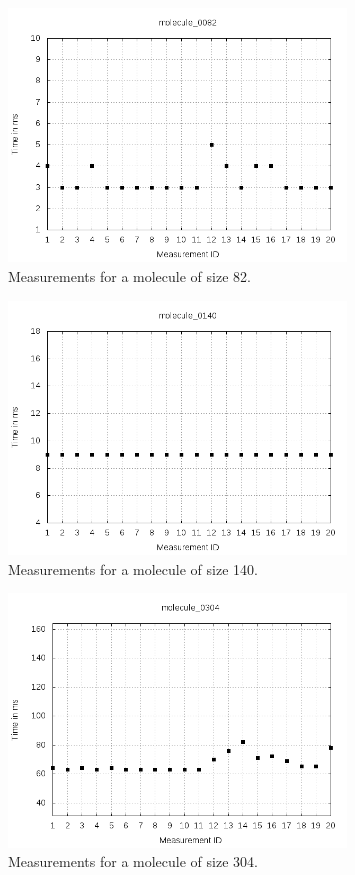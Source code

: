 \documentclass[a4paper,12pt]{article}
\begin{document}
\begin{figure}[!h]
  \centering
    \includegraphics[width=0.8\textwidth]{images/solver-perf-molecule_0082.png}
  \caption{Measurements for a molecule of size 82.}
\end{figure}

\begin{figure}[!h]
  \centering
    \includegraphics[width=0.8\textwidth]{images/solver-perf-molecule_0140.png}
  \caption{Measurements for a molecule of size 140.}
\end{figure}

\begin{figure}[!h]
  \centering
    \includegraphics[width=0.8\textwidth]{images/solver-perf-molecule_0304.png}
  \caption{Measurements for a molecule of size 304.}
\end{figure}
\end{document}
